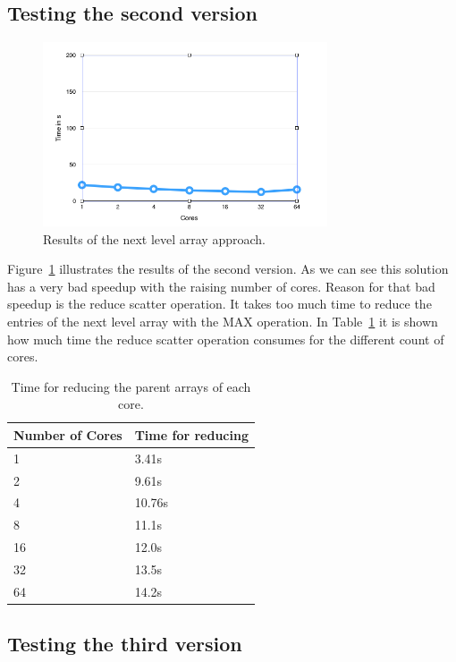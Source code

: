 \documentclass[12pt,a4paper]{article}
\begin{document}
\subsection{Testing the second version}

\begin{figure}[!ht]
   \centering
   \includegraphics[width=0.75\textwidth]{parent_array}
   \caption{Results of the next level array approach.}
   \label{fig:parentarray}
\end{figure}

Figure~\ref{fig:parentarray} illustrates the results of the second version. As we can see this solution has a very bad speedup with the raising number of cores. Reason for that bad speedup is the reduce scatter operation. It takes too much time to reduce the entries of the next level array with the MAX operation. In Table~\ref{tab:reducescatter} it is shown how much time the reduce scatter operation consumes for the different count of cores.

\begin{table}[!ht]
	\centering
	\begin{tabular}{ | l | l |}
  		\hline
  		Number of Cores & Time for reducing \\ \hline
  		1 & 3.41s \\ \hline
		2 & 9.61s \\ \hline
		4 & 10.76s \\ \hline
		8 & 11.1s \\ \hline
		16 & 12.0s \\ \hline
		32 & 13.5s \\ \hline
		64 & 14.2s \\ \hline
	\end{tabular}
	\caption{Time for reducing the parent arrays of each core.}
  	\label{tab:reducescatter}
\end{table}

\subsection{Testing the third version}
\end{document}

